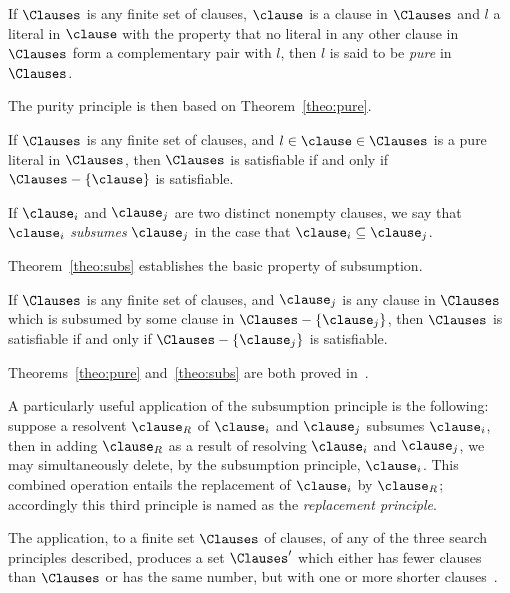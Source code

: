 \begin{definition}
    If $\Clauses$ is any finite set of clauses, $\clause$ is a clause in
    $\Clauses$ and $l$ a literal in $\clause$ with the property that no literal
    in any other clause in $\Clauses$ form a complementary pair with $l$, then
    $l$ is said to be \emph{pure} in $\Clauses$.
\end{definition}

The purity principle is then based on Theorem~\ref{theo:pure}.

\begin{theorem}%
    \label{theo:pure}
    If $\Clauses$ is any finite set of clauses, and $l \in \clause \in \Clauses$
    is a pure literal in $\Clauses$, then $\Clauses$ is satisfiable if and only
    if $\Clauses - \{\clause\}$ is satisfiable.
\end{theorem}

\begin{definition}
    If $\clause_i$ and $\clause_j$ are two distinct nonempty clauses, we say
    that $\clause_i$ \emph{subsumes} $\clause_j$ in the case that $\clause_i
    \subseteq \clause_j$. 
\end{definition}

Theorem~\ref{theo:subs} establishes the basic property of subsumption.

\begin{theorem}%
    \label{theo:subs}
    If $\Clauses$ is any finite set of clauses, and $\clause_j$ is any clause
    in $\Clauses$ which is subsumed by some clause in $\Clauses -
    \{\clause_j\}$, then $\Clauses$ is satisfiable if and only if $\Clauses -
    \{\clause_j\}$ is satisfiable.
\end{theorem}

Theorems~\ref{theo:pure} and~\ref{theo:subs} are both proved in~\cite{Robinson65}.

A particularly useful application of the subsumption principle is the following:
suppose a resolvent $\clause_R$ of $\clause_i$ and $\clause_j$ subsumes
$\clause_i$, then in adding $\clause_R$ as a result of resolving $\clause_i$ and
$\clause_j$, we may simultaneously delete, by the subsumption principle,
$\clause_i$. This combined operation entails the replacement of $\clause_i$ by
$\clause_R$; accordingly this third principle is named as the \emph{replacement
principle}.

The application, to a finite set $\Clauses$ of clauses, of any of the three
search principles described, produces a set $\Clauses'$ which either has fewer
clauses than $\Clauses$ or has the same number, but with one or more shorter
clauses~\cite{Robinson65}. 

